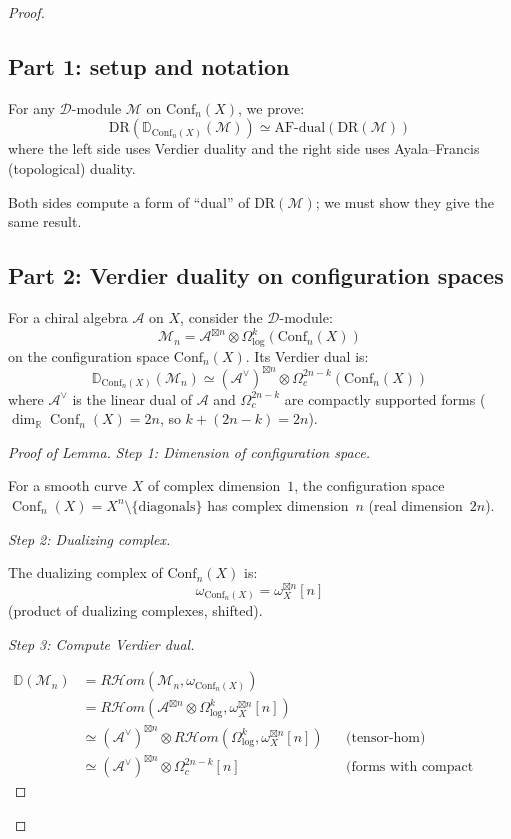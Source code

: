 \begin{proof}

\subsection*{Part 1: setup and notation}

For any $\mathcal{D}$-module $\mathcal{M}$ on $\mathrm{Conf}_n(X)$, we prove:
\[\text{DR}(\mathbb{D}_{\text{Conf}_n(X)}(\mathcal{M})) \simeq \text{AF-dual}(\text{DR}(\mathcal{M}))\]
where the left side uses Verdier duality and the right side uses Ayala--Francis (topological) duality.

Both sides compute a form of ``dual'' of $\text{DR}(\mathcal{M})$; we must show they give the same result.

\subsection*{Part 2: Verdier duality on configuration spaces}

\begin{lemma}\label{lem:verdier-dual-chiral}
For a chiral algebra $\mathcal{A}$ on $X$, consider the $\mathcal{D}$-module:
\[\mathcal{M}_n = \mathcal{A}^{\boxtimes n} \otimes \Omega^k_{\log}(\text{Conf}_n(X))\]
on the configuration space $\text{Conf}_n(X)$. Its Verdier dual is:
\[\mathbb{D}_{\text{Conf}_n(X)}(\mathcal{M}_n) \simeq (\mathcal{A}^\vee)^{\boxtimes n} \otimes \Omega^{2n-k}_c(\text{Conf}_n(X))\]
where $\mathcal{A}^\vee$ is the linear dual of $\mathcal{A}$ and $\Omega^{2n-k}_c$ are compactly supported forms
($\dim_{\mathbb{R}}\operatorname{Conf}_n(X) = 2n$, so
$k + (2n{-}k) = 2n$).
\end{lemma}

\begin{proof}[Proof of Lemma]
\emph{Step 1: Dimension of configuration space.}

For a smooth curve $X$ of complex dimension~$1$, the configuration space $\operatorname{Conf}_n(X) = X^n \setminus \{\text{diagonals}\}$ has complex dimension~$n$ (real dimension~$2n$).

\emph{Step 2: Dualizing complex.}

The dualizing complex of $\text{Conf}_n(X)$ is:
\[\omega_{\text{Conf}_n(X)} = \omega_X^{\boxtimes n}[n]\]
(product of dualizing complexes, shifted).

\emph{Step 3: Compute Verdier dual.}

\begin{align*}
\mathbb{D}(\mathcal{M}_n)
&= R\mathcal{H}om(\mathcal{M}_n, \omega_{\text{Conf}_n(X)}) \\
&= R\mathcal{H}om(\mathcal{A}^{\boxtimes n} \otimes \Omega^k_{\log}, \omega_X^{\boxtimes n}[n]) \\
&\simeq (\mathcal{A}^\vee)^{\boxtimes n} \otimes R\mathcal{H}om(\Omega^k_{\log}, \omega_X^{\boxtimes n}[n]) && \text{(tensor-hom)} \\
&\simeq (\mathcal{A}^\vee)^{\boxtimes n} \otimes \Omega^{2n-k}_c[n] && \text{(forms with compact support)}
\end{align*}


\end{proof}
\end{proof}
